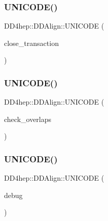 \subsubsection{\texorpdfstring{U\+N\+I\+C\+O\+D\+E()}{UNICODE()}\hspace{0.1cm}{\footnotesize\ttfamily [14/16]}}
{\footnotesize\ttfamily D\+D4hep\+::\+D\+D\+Align\+::\+U\+N\+I\+C\+O\+DE (\begin{DoxyParamCaption}\item[{close\+\_\+transaction}]{ }\end{DoxyParamCaption})}

\hypertarget{namespace_d_d4hep_1_1_d_d_align_aa5e5a3c901780b457658bd9825bb376a}{}\label{namespace_d_d4hep_1_1_d_d_align_aa5e5a3c901780b457658bd9825bb376a} 
\subsubsection{\texorpdfstring{U\+N\+I\+C\+O\+D\+E()}{UNICODE()}\hspace{0.1cm}{\footnotesize\ttfamily [15/16]}}
{\footnotesize\ttfamily D\+D4hep\+::\+D\+D\+Align\+::\+U\+N\+I\+C\+O\+DE (\begin{DoxyParamCaption}\item[{check\+\_\+overlaps}]{ }\end{DoxyParamCaption})}

\hypertarget{namespace_d_d4hep_1_1_d_d_align_ae4e3eb8b7bab297efc0079f41e26d25f}{}\label{namespace_d_d4hep_1_1_d_d_align_ae4e3eb8b7bab297efc0079f41e26d25f} 
\subsubsection{\texorpdfstring{U\+N\+I\+C\+O\+D\+E()}{UNICODE()}\hspace{0.1cm}{\footnotesize\ttfamily [16/16]}}
{\footnotesize\ttfamily D\+D4hep\+::\+D\+D\+Align\+::\+U\+N\+I\+C\+O\+DE (\begin{DoxyParamCaption}\item[{debug}]{ }\end{DoxyParamCaption})}

